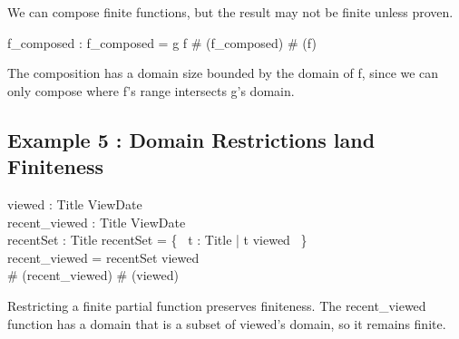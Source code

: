 \documentclass[a4paper,10pt,fleqn]{article}
\begin{document}
\noindent We can compose finite functions, but the result may not be finite unless proven.

\bigskip

\begin{axdef}
f\_composed : \nat \ffun \nat
\where
f\_composed = g \comp f \land \# (\dom f\_composed) \leq \# (\dom f)
\end{axdef}

\noindent The composition has a domain size bounded by the domain of f, since we can only compose where f's range intersects g's domain.

\bigskip

\subsection*{Example 5 : Domain Restrictions land Finiteness}

\begin{zed}
\end{zed}

\begin{axdef}
viewed : Title \ffun ViewDate \\
recent\_viewed : Title \ffun ViewDate \\
recentSet : \power Title
\where
recentSet = \{~ t : Title | t \in \dom viewed ~\} \land \\
\quad recent\_viewed = recentSet \dres viewed \land \\
\quad \# (\dom recent\_viewed) \leq \# (\dom viewed)
\end{axdef}

\noindent Restricting a finite partial function preserves finiteness. The recent\_viewed function has a domain that is a subset of viewed's domain, so it remains finite.

\bigskip
\end{document}
